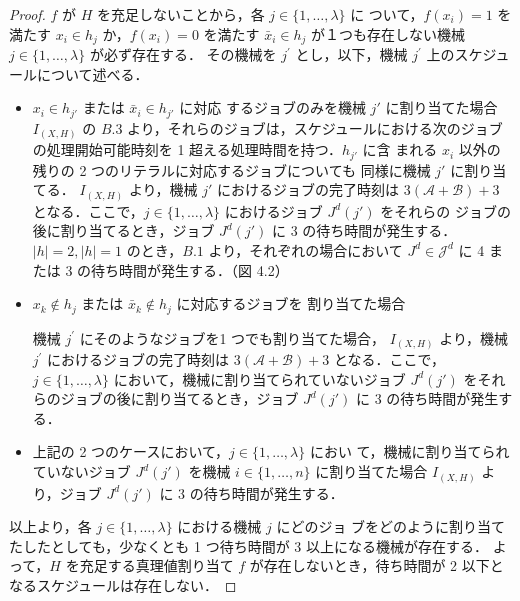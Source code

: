 \documentclass[12pt]{optlab-bachelor}
\begin{document}
\begin{proof}
  $f$ が $H$ を充足しないことから，各 $j \in \{1, \ldots, \lambda \}$ に
  ついて，$f(x_i) = 1$ を満たす $x_i \in h_j$ か，$f(x_i) = 0$ を満たす
  $\bar x_i \in h_j$ が１つも存在しない機械 $j \in \{1,\ldots, \lambda\}$ が必ず存在する．
  その機械を $j^{\prime}$ とし，以下，機械 $j^{\prime}$ 上のスケジュールについて述べる．
  \begin{itemize}
    \item $x_i \in h_{j'}$ または $\bar x_i \in h_{j'}$ に対応
    するジョブのみを機械 $j'$ に割り当てた場合
    $I_{(X,H)}$ の $B.3$ より，それらのジョブは，スケジュールにおける次のジョブの処理開始可能時刻を 1 超える処理時間を持つ．$h_{j'}$ に含
    まれる $x_i$ 以外の残りの 2 つのリテラルに対応するジョブについても
    同様に機械 $j'$ に割り当てる．
    $I_{(X,H)}$ より，機械 $j'$ におけるジョブの完了時刻は
    $3(\mathcal{A} + \mathcal{B}) + 3$ となる．ここで，$j \in
    \{1,\ldots,\lambda\}$ におけるジョブ $J^d(j')$ をそれらの
    ジョブの後に割り当てるとき，ジョブ $J^d(j')$ に 3 の待ち時間が発生する．$|h| = 2,|h| = 1$ のとき，$B.1$ より，それぞれの場合において $J^d \in \mathcal{J}^d$ に 4 または 3 の待ち時間が発生する．（図 4.2）
  \end{itemize}

  \begin{itemize}
    \item $x_k \notin h_j$ または $\bar x_k \notin h_j$ に対応するジョブを
    割り当てた場合

    機械 $j^{\prime}$ にそのようなジョブを1 つでも割り当てた場合，
    $I_{(X,H)}$ より，機械 $j^{\prime}$ におけるジョブの完了時刻は
    $3(\mathcal{A} + \mathcal{B}) + 3$ となる．ここで，$j \in
    \{1,\ldots,\lambda\}$ において，機械に割り当てられていないジョブ
    $J^d(j')$ をそれらのジョブの後に割り当てるとき，ジョブ
    $J^d(j')$ に 3 の待ち時間が発生する．
    \item 上記の 2 つのケースにおいて，$j \in \{1,\ldots,\lambda\}$ におい
    て，機械に割り当てられていないジョブ $J^d(j')$ を機械 $i
    \in \{1,\ldots,n\}$ に割り当てた場合 $I_{(X,H)}$ より，ジョブ
    $J^d(j')$ に 3 の待ち時間が発生する．
  \end{itemize}
  以上より，各 $j \in \{1,\ldots,\lambda\}$ における機械 $j$ にどのジョ
  ブをどのように割り当てたしたとしても，少なくとも 1 つ待ち時間が 3 以上になる機械が存在する．
  よって，$H$ を充足する真理値割り当て $f$ が存在しないとき，待ち時間が 2 以下となるスケジュールは存在しない．
\end{proof}
\end{document}
